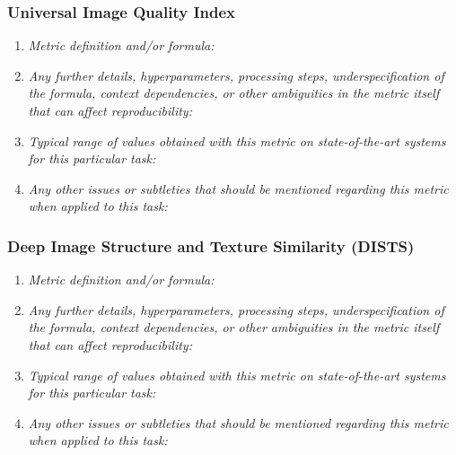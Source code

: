 \documentclass[a4paper,11pt]{article}
\begin{document}
        \subsubsection{Universal Image Quality Index}
            \begin{enumerate}[label=\alph*.]
                \item \textit{Metric definition and/or formula:}
                \bigskip
                \item \textit{Any further details, hyperparameters, processing steps, underspecification of the formula, context dependencies, or other ambiguities in the metric itself that can affect reproducibility:}
                \bigskip
                \item \textit{Typical range of values obtained with this metric on state-of-the-art systems for this particular task:}
                \bigskip
                \item \textit{Any other issues or subtleties that should be mentioned regarding this metric when applied to this task:}
                \bigskip
            \end{enumerate}
        \subsubsection{Deep Image Structure and Texture Similarity (DISTS)}
            \begin{enumerate}[label=\alph*.]
                \item \textit{Metric definition and/or formula:}
                \bigskip
                \item \textit{Any further details, hyperparameters, processing steps, underspecification of the formula, context dependencies, or other ambiguities in the metric itself that can affect reproducibility:}
                \bigskip
                \item \textit{Typical range of values obtained with this metric on state-of-the-art systems for this particular task:}
                \bigskip
                \item \textit{Any other issues or subtleties that should be mentioned regarding this metric when applied to this task:}
                \bigskip
            \end{enumerate}
\end{document}
